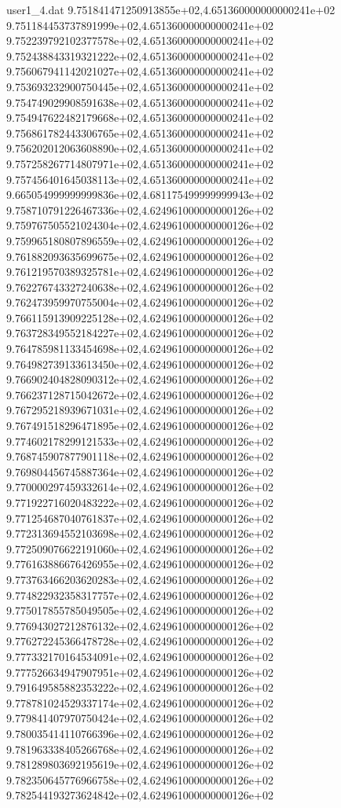 \begin{filecontents}{user1_4.dat}
9.751841471250913855e+02,4.651360000000000241e+02
9.751184453737891999e+02,4.651360000000000241e+02
9.752239792102377578e+02,4.651360000000000241e+02
9.752438843319321222e+02,4.651360000000000241e+02
9.756067941142021027e+02,4.651360000000000241e+02
9.753693232900750445e+02,4.651360000000000241e+02
9.754749029908591638e+02,4.651360000000000241e+02
9.754947622482179668e+02,4.651360000000000241e+02
9.756861782443306765e+02,4.651360000000000241e+02
9.756202012063608890e+02,4.651360000000000241e+02
9.757258267714807971e+02,4.651360000000000241e+02
9.757456401645038113e+02,4.651360000000000241e+02
9.665054999999999836e+02,4.681175499999999943e+02
9.758710791226467336e+02,4.624961000000000126e+02
9.759767505521024304e+02,4.624961000000000126e+02
9.759965180807896559e+02,4.624961000000000126e+02
9.761882093635699675e+02,4.624961000000000126e+02
9.761219570389325781e+02,4.624961000000000126e+02
9.762276743327240638e+02,4.624961000000000126e+02
9.762473959970755004e+02,4.624961000000000126e+02
9.766115913909225128e+02,4.624961000000000126e+02
9.763728349552184227e+02,4.624961000000000126e+02
9.764785981133454698e+02,4.624961000000000126e+02
9.764982739133613450e+02,4.624961000000000126e+02
9.766902404828090312e+02,4.624961000000000126e+02
9.766237128715042672e+02,4.624961000000000126e+02
9.767295218939671031e+02,4.624961000000000126e+02
9.767491518296471895e+02,4.624961000000000126e+02
9.774602178299121533e+02,4.624961000000000126e+02
9.768745907877901118e+02,4.624961000000000126e+02
9.769804456745887364e+02,4.624961000000000126e+02
9.770000297459332614e+02,4.624961000000000126e+02
9.771922716020483222e+02,4.624961000000000126e+02
9.771254687040761837e+02,4.624961000000000126e+02
9.772313694552103698e+02,4.624961000000000126e+02
9.772509076622191060e+02,4.624961000000000126e+02
9.776163886676426955e+02,4.624961000000000126e+02
9.773763466203620283e+02,4.624961000000000126e+02
9.774822932358317757e+02,4.624961000000000126e+02
9.775017855785049505e+02,4.624961000000000126e+02
9.776943027212876132e+02,4.624961000000000126e+02
9.776272245366478728e+02,4.624961000000000126e+02
9.777332170164534091e+02,4.624961000000000126e+02
9.777526634947907951e+02,4.624961000000000126e+02
9.791649585882353222e+02,4.624961000000000126e+02
9.778781024529337174e+02,4.624961000000000126e+02
9.779841407970750424e+02,4.624961000000000126e+02
9.780035414110766396e+02,4.624961000000000126e+02
9.781963338405266768e+02,4.624961000000000126e+02
9.781289803692195619e+02,4.624961000000000126e+02
9.782350645776966758e+02,4.624961000000000126e+02
9.782544193273624842e+02,4.624961000000000126e+02

\end{filecontents}
